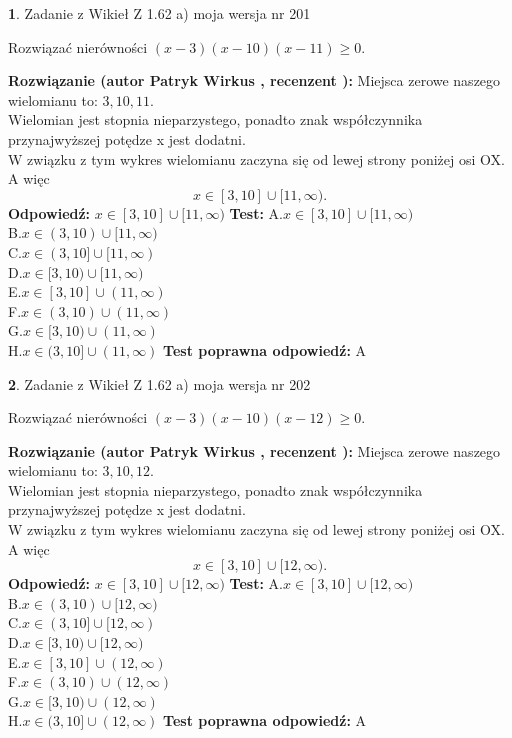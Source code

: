 \documentclass[12pt, a4paper]{article}
\theoremstyle{definition} %
\newtheorem{zad}{}
\newcommand{\zadStart}[1]{\begin{zad}#1\newline}
\newcommand{\zadStop}{\end{zad}}
\newcommand{\rozwStart}[2]{\noindent \textbf{Rozwiązanie (autor #1 , recenzent #2): }\newline}
\newcommand{\rozwStop}{\newline}
\newcommand{\odpStart}{\noindent \textbf{Odpowiedź:}\newline}
\newcommand{\odpStop}{\newline}
\newcommand{\testStart}{\noindent \textbf{Test:}\newline}
\newcommand{\testStop}{\newline}
\newcommand{\kluczStart}{\noindent \textbf{Test poprawna odpowiedź:}\newline}
\newcommand{\kluczStop}{\newline}
\begin{document}
\zadStart{Zadanie z Wikieł Z 1.62 a) moja wersja nr 201}

Rozwiązać nierówności $(x-3)(x-10)(x-11)\ge0$.
\zadStop
\rozwStart{Patryk Wirkus}{}
Miejsca zerowe naszego wielomianu to: $3, 10, 11$.\\
Wielomian jest stopnia nieparzystego, ponadto znak współczynnika przy\linebreak najwyższej potędze x jest dodatni.\\ W związku z tym wykres wielomianu zaczyna się od lewej strony poniżej osi OX. A więc $$x \in [3,10] \cup [11,\infty).$$
\rozwStop
\odpStart
$x \in [3,10] \cup [11,\infty)$
\odpStop
\testStart
A.$x \in [3,10] \cup [11,\infty)$\\
B.$x \in (3,10) \cup [11,\infty)$\\
C.$x \in (3,10] \cup [11,\infty)$\\
D.$x \in [3,10) \cup [11,\infty)$\\
E.$x \in [3,10] \cup (11,\infty)$\\
F.$x \in (3,10) \cup (11,\infty)$\\
G.$x \in [3,10) \cup (11,\infty)$\\
H.$x \in (3,10] \cup (11,\infty)$
\testStop
\kluczStart
A
\kluczStop



\zadStart{Zadanie z Wikieł Z 1.62 a) moja wersja nr 202}

Rozwiązać nierówności $(x-3)(x-10)(x-12)\ge0$.
\zadStop
\rozwStart{Patryk Wirkus}{}
Miejsca zerowe naszego wielomianu to: $3, 10, 12$.\\
Wielomian jest stopnia nieparzystego, ponadto znak współczynnika przy\linebreak najwyższej potędze x jest dodatni.\\ W związku z tym wykres wielomianu zaczyna się od lewej strony poniżej osi OX. A więc $$x \in [3,10] \cup [12,\infty).$$
\rozwStop
\odpStart
$x \in [3,10] \cup [12,\infty)$
\odpStop
\testStart
A.$x \in [3,10] \cup [12,\infty)$\\
B.$x \in (3,10) \cup [12,\infty)$\\
C.$x \in (3,10] \cup [12,\infty)$\\
D.$x \in [3,10) \cup [12,\infty)$\\
E.$x \in [3,10] \cup (12,\infty)$\\
F.$x \in (3,10) \cup (12,\infty)$\\
G.$x \in [3,10) \cup (12,\infty)$\\
H.$x \in (3,10] \cup (12,\infty)$
\testStop
\kluczStart
A
\kluczStop
\end{document}
